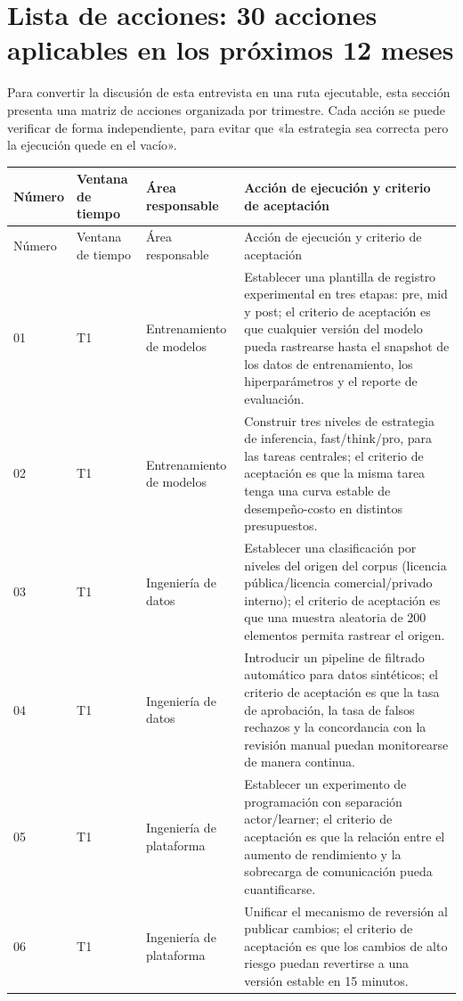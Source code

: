 \section{Lista de acciones: 30 acciones aplicables en los próximos 12 meses}

Para convertir la discusión de esta entrevista en una ruta ejecutable, esta sección presenta una matriz de acciones organizada por trimestre. Cada acción se puede verificar de forma independiente, para evitar que «la estrategia sea correcta pero la ejecución quede en el vacío».

\begin{longtable}{p{}p{}p{}p{}}
\toprule
Número & Ventana de tiempo & Área responsable & Acción de ejecución y criterio de aceptación \\
\midrule
\endfirsthead
\toprule
Número & Ventana de tiempo & Área responsable & Acción de ejecución y criterio de aceptación \\
\midrule
\endhead
01 & T1 & Entrenamiento de modelos & Establecer una plantilla de registro experimental en tres etapas: pre, mid y post; el criterio de aceptación es que cualquier versión del modelo pueda rastrearse hasta el snapshot de los datos de entrenamiento, los hiperparámetros y el reporte de evaluación. \\
02 & T1 & Entrenamiento de modelos & Construir tres niveles de estrategia de inferencia, fast/think/pro, para las tareas centrales; el criterio de aceptación es que la misma tarea tenga una curva estable de desempeño-costo en distintos presupuestos. \\
03 & T1 & Ingeniería de datos & Establecer una clasificación por niveles del origen del corpus (licencia pública/licencia comercial/privado interno); el criterio de aceptación es que una muestra aleatoria de 200 elementos permita rastrear el origen. \\
04 & T1 & Ingeniería de datos & Introducir un pipeline de filtrado automático para datos sintéticos; el criterio de aceptación es que la tasa de aprobación, la tasa de falsos rechazos y la concordancia con la revisión manual puedan monitorearse de manera continua. \\
05 & T1 & Ingeniería de plataforma & Establecer un experimento de programación con separación actor/learner; el criterio de aceptación es que la relación entre el aumento de rendimiento y la sobrecarga de comunicación pueda cuantificarse. \\
06 & T1 & Ingeniería de plataforma & Unificar el mecanismo de reversión al publicar cambios; el criterio de aceptación es que los cambios de alto riesgo puedan revertirse a una versión estable en 15 minutos. \\

\end{longtable}
